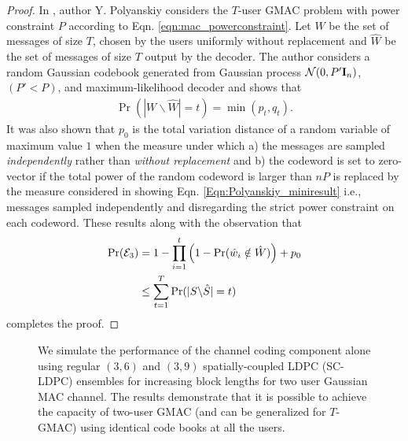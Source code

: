 \begin{proof}
In \cite{polyanskiy2017perspective}, author Y. Polyanskiy considers the $T$-user GMAC problem with power constraint $P$ according to Eqn. \eqref{eqn:mac_powerconstraint}. Let $W$ be the set of messages of size $T$, chosen by the users uniformly without replacement and $\hat{W}$ be the set of messages of size $T$ output by the decoder. The author considers a random Gaussian codebook generated from Gaussian process $\mathcal{N}(0,P'\mathbf{I}_n)$,  $(P'<P)$, and maximum-likelihood decoder and shows that
\begin{align}
\Pr(|W\backslash \hat{W}|=t)=\min(p_t,q_t).
\label{Eqn:Polyanskiy_miniresult}
\end{align}
It was also shown that $p_0$ is the total variation distance of a random variable of maximum value $1$ when the measure under which a) the messages are sampled \textit{independently} rather than \textit{without replacement} and b) the codeword is set to zero-vector if the total power of the random codeword is larger than $nP$ is replaced by the measure considered in showing Eqn. \eqref{Eqn:Polyanskiy_miniresult} i.e., messages sampled independently and disregarding the strict power constraint on each codeword. These results along with the observation that
\begin{align*}
\mathrm{Pr}(\mathcal{E}_3)&=1-\prod_{i=1}^{t}\left(1-\mathrm{Pr}(\hat{w}_i\notin\hat{W})\right)+p_0\\
					&\leq\sum_{t=1}^{T} \mathrm{Pr}(|S\backslash\hat{S}|=t)
\end{align*}
completes the proof.
\end{proof}

\begin{figure}[!ht]
  \centering
  \resizebox{0.85\textwidth}{!}{}
  \caption{We simulate the performance of the channel coding component alone using regular $(3,6)$ and $(3,9)$ spatially-coupled LDPC (SC-LDPC) ensembles for increasing block lengths for two user Gaussian MAC channel. The results demonstrate that it is possible to achieve the capacity of two-user GMAC (and can be generalized for $T$-GMAC) using identical code books at all the users.}
  \label{fig:scldpc}
\end{figure}


